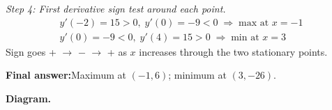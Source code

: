 \documentclass[11pt]{article}
\begin{document}
\textit{Step 4: First derivative sign test around each point.}
\[\begin{gathered}
y'(-2) = 15 > 0, \; y'(0) = -9 < 0 \; \Rightarrow \; \text{max at } x = -1 \\ y'(0) = -9 < 0, \; y'(4) = 15 > 0 \; \Rightarrow \; \text{min at } x = 3
\end{gathered}\]
Sign goes + $\to$ $-$ $\to$ + as \( x \) increases through the two stationary points.

\begin{answerbox}
\textbf{Final answer:}\quad Maximum at \(\displaystyle  (-1, 6) \); minimum at \(\displaystyle  (3, -26) \).
\end{answerbox}
\textbf{Diagram.}

\begin{center}
\end{center}
\end{document}
